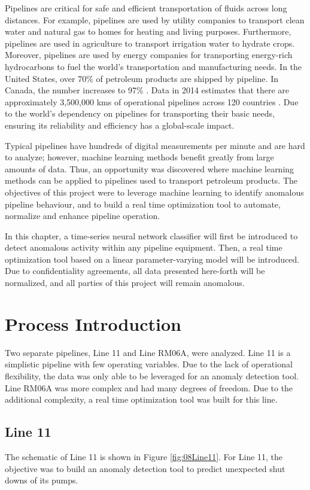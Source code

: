 Pipelines are critical for safe and efficient transportation of fluids across long distances.  For example, pipelines are used by utility companies to transport clean water and natural gas to homes for heating and living purposes.  Furthermore, pipelines are used in agriculture to transport irrigation water to hydrate crops.  Moreover, pipelines are used by energy companies for transporting energy-rich hydrocarbons to fuel the world's transportation and manufacturing needs. In the United States, over 70\% of petroleum products are shipped by pipeline.  In Canada, the number increases to 97\% \cite{pipeline_transport}.  Data in 2014 estimates that there are approximately 3,500,000 kms of operational pipelines across 120 countries \cite{CIA_pipeline}. Due to the world's dependency on pipelines for transporting their basic needs, ensuring its reliability and efficiency has a global-scale impact.

Typical pipelines have hundreds of digital measurements per minute and are hard to analyze; however, machine learning methods benefit greatly from large amounts of data. Thus, an opportunity was discovered where machine learning methods can be applied to pipelines used to transport petroleum products. The objectives of this project were to leverage machine learning to identify anomalous pipeline behaviour, and to build a real time optimization tool to automate, normalize and enhance pipeline operation.

In this chapter, a time-series neural network classifier will first be introduced to detect anomalous activity within any pipeline equipment. Then, a real time optimization tool based on a linear parameter-varying model will be introduced.  Due to confidentiality agreements, all data presented here-forth will be normalized, and all parties of this project will remain anomalous.

\section{Process Introduction}
Two separate pipelines, Line 11 and Line RM06A, were analyzed.  Line 11 is a simplistic pipeline with few operating variables. Due to the lack of operational flexibility, the data was only able to be leveraged for an anomaly detection tool.  Line RM06A was more complex and had many degrees of freedom. Due to the additional complexity, a real time optimization tool was built for this line.

\subsection{Line 11}
The schematic of Line 11 is shown in Figure \ref{fig:08Line11}. For Line 11, the objective was to build an anomaly detection tool to predict unexpected shut downs of its pumps.  


